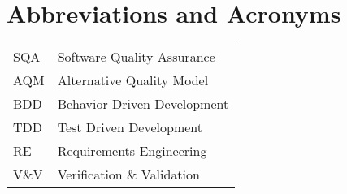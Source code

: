 \chapter*{Abbreviations and Acronyms}


\noindent
\begin{longtable}{@{}p{}p{}@{}}
SQA & Software Quality Assurance \\
AQM & Alternative Quality Model \\
BDD & Behavior Driven Development \\
TDD & Test Driven Development \\
RE & Requirements Engineering \\
V\&V & Verification \& Validation \\
\end{longtable}
